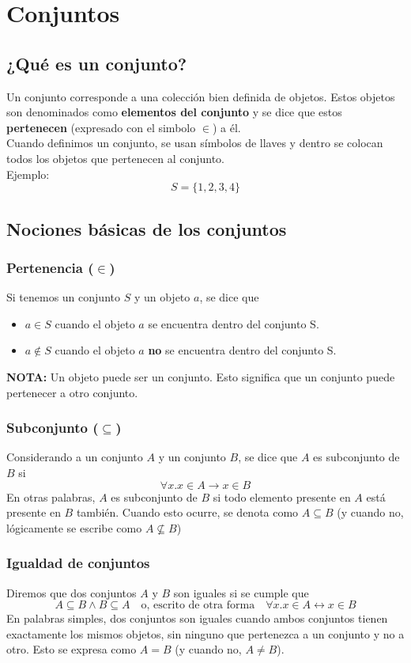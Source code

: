 \documentclass[../main.tex]{subfiles}
\begin{document}
\section{Conjuntos}
\subsection{¿Qué es un conjunto?}
Un conjunto corresponde a una colección bien definida de objetos. Estos objetos son denominados como \textbf{elementos del conjunto} y se dice que estos \textbf{pertenecen} (expresado con el simbolo $\in$) a él.\\
Cuando definimos un conjunto, se usan símbolos de llaves y dentro se colocan todos los objetos que pertenecen al conjunto.\\
Ejemplo:
\[ S = \{ 1, 2, 3, 4 \} \]

\subsection{Nociones básicas de los conjuntos}
\subsubsection{Pertenencia ($\in$)}
Si tenemos un conjunto $S$ y un objeto $a$, se dice que
\begin{itemize}
    \item $a \in S$ cuando el objeto $a$ se encuentra dentro del conjunto S.
    \item $a \not\in S$ cuando el objeto $a$ \textbf{no} se encuentra dentro del conjunto S.
\end{itemize}
\textbf{NOTA:} Un objeto puede ser un conjunto. Esto significa que un conjunto puede pertenecer a otro conjunto.

\subsubsection{Subconjunto ($\subseteq$)}
Considerando a un conjunto $A$ y un conjunto $B$, se dice que $A$ es subconjunto de $B$ si
\[ \forall x . x \in A \rightarrow x \in B \]
En otras palabras, $A$ es subconjunto de $B$ si todo elemento presente en $A$ está presente en $B$ también. Cuando esto ocurre, se denota como $A \subseteq B$ (y cuando no, lógicamente se escribe como $A \not\subseteq B$)

\subsubsection{Igualdad de conjuntos}
Diremos que dos conjuntos $A$ y $B$ son iguales si se cumple que
\[ A \subseteq B \wedge B \subseteq A \quad \text{o, escrito de otra forma} \quad \forall x . x \in A \leftrightarrow x \in B \]
En palabras simples, dos conjuntos son iguales cuando ambos conjuntos tienen exactamente los mismos objetos, sin ninguno que pertenezca a un conjunto y no a otro. Esto se expresa como $A = B$ (y cuando no, $A \not= B$).
\end{document}
